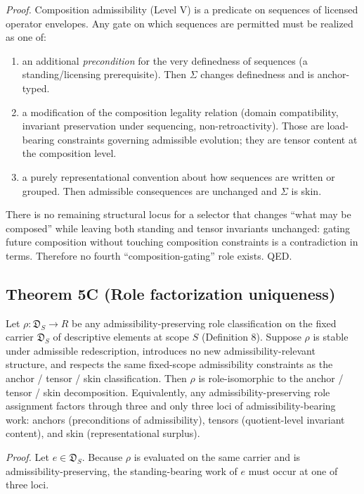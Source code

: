 \documentclass[12pt]{article}
\theoremstyle{plain}
\begin{document}
\textit{Proof.} Composition admissibility (Level V) is a predicate on sequences of licensed operator envelopes. Any gate on which sequences are permitted must be realized as one of:

\begin{enumerate}[leftmargin=*]
\item an additional \emph{precondition} for the very definedness of sequences (a standing/licensing prerequisite). Then $\Sigma$ changes definedness and is anchor-typed.

\item a modification of the composition legality relation (domain compatibility, invariant preservation under sequencing, non-retroactivity). Those are load-bearing constraints governing admissible evolution; they are tensor content at the composition level.

\item a purely representational convention about how sequences are written or grouped. Then admissible consequences are unchanged and $\Sigma$ is skin.
\end{enumerate}

There is no remaining structural locus for a selector that changes ``what may be composed'' while leaving both standing and tensor invariants unchanged: gating future composition without touching composition constraints is a contradiction in terms. Therefore no fourth ``composition-gating'' role exists. QED.


\subsection{Theorem 5C (Role factorization uniqueness)}

Let $\rho: \mathfrak{D}_S \to R$ be any admissibility-preserving role classification on the fixed carrier $\mathfrak{D}_S$ of descriptive elements at scope $S$ (Definition 8). Suppose $\rho$ is stable under admissible redescription, introduces no new admissibility-relevant structure, and respects the same fixed-scope admissibility constraints as the anchor / tensor / skin classification. Then $\rho$ is role-isomorphic to the anchor / tensor / skin decomposition. Equivalently, any admissibility-preserving role assignment factors through three and only three loci of admissibility-bearing work: anchors (preconditions of admissibility), tensors (quotient-level invariant content), and skin (representational surplus).

\textit{Proof.} Let $e\in \mathfrak{D}_S$. Because $\rho$ is evaluated on the same carrier and is admissibility-preserving, the standing-bearing work of $e$ must occur at one of three loci.
\end{document}
